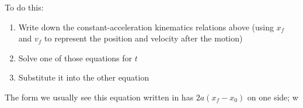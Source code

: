 \documentclass[12pt]{article}
\begin{document}
To do this:

\begin{enumerate}
\item Write down the constant-acceleration kinematics relations above (using $x_f$ and $v_f$ to represent the position and velocity after the motion)
\item Solve one of those equations for $t$
\item Substitute it into the other equation
\end{enumerate}

The form we usually see this equation written in has $2a(x_f - x_0)$ on one side; w
\end{document}
